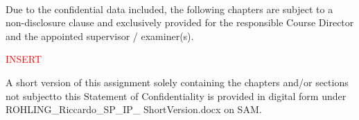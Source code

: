 \thispagestyle{empty}
\begin{center}
	\type

	\vspace{1.5cm}

	\studentfirstname~\studentlastname

	\huge \textbf{\titleSperrvermerk}
\end{center}

\begin{spacing}{1.5}
	Due to the confidential data included, the following chapters are subject to a 
non-disclosure clause and exclusively provided for the responsible 
Course Director and the appointed supervisor / examiner(s).
\end{spacing}

 {\huge \textcolor{red}{INSERT}} %


\vspace{2cm} %

\begin{spacing}{1.5}
A short version of this assignment solely containing the chapters and/or sections 
not subjectto this Statement of Confidentiality is provided in digital form under
\textnormal{ROHLING\_\allowbreak Riccardo\_\allowbreak SP\_\allowbreak IP\_
\allowbreak ShortVersion.docx} on SAM.
\end{spacing}
